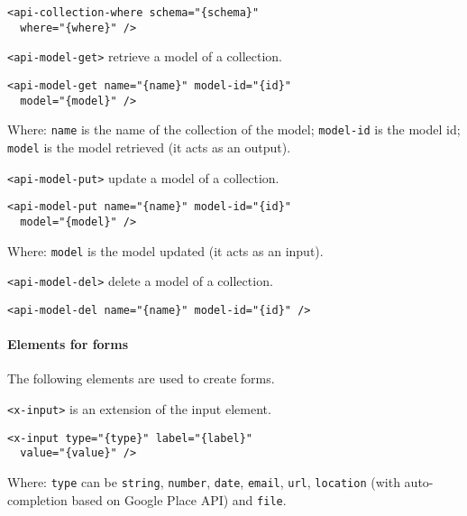 \begin{lstlisting}[language=HTML5]
<api-collection-where schema="{schema}"
  where="{where}" />
\end{lstlisting}

\texttt{<api-model-get>} retrieve a model of a collection. 

\begin{lstlisting}[language=HTML5]
<api-model-get name="{name}" model-id="{id}" 
  model="{model}" />
\end{lstlisting}

Where: 
\texttt{name} is the name of the collection of the model; 
\texttt{model-id} is the model id; 
\texttt{model} is the model retrieved (it acts as an output).

\texttt{<api-model-put>} update a model of a collection. 

\begin{lstlisting}[language=HTML5]
<api-model-put name="{name}" model-id="{id}" 
  model="{model}" />
\end{lstlisting}

Where: 
\texttt{model} is the model updated (it acts as an input).

\vspace{0.2cm}

\texttt{<api-model-del>} delete a model of a collection. 

\begin{lstlisting}[language=HTML5]
<api-model-del name="{name}" model-id="{id}" />
\end{lstlisting}

\paragraph{Elements for forms}
The following elements are used to create forms. 

\vspace{0.2cm}

\texttt{<x-input>} is an extension of the input element. 

\begin{lstlisting}[language=HTML5]
<x-input type="{type}" label="{label}"
  value="{value}" />
\end{lstlisting}

Where: 
\texttt{type} can be \texttt{string}, \texttt{number}, \texttt{date}, \texttt{email}, \texttt{url}, \texttt{location} (with auto-completion based on Google Place API) and \texttt{file}.

\vspace{0.2cm}

